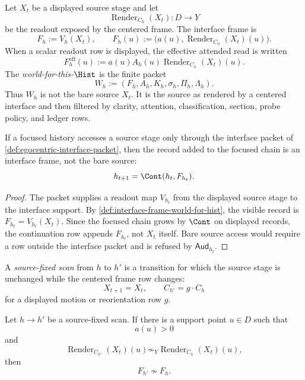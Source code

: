 \begin{definition}
\label{def:interface-frame-world-for-hist}
Let $X_t$ be a displayed source stage and let
$$
\operatorname{Render}_{C_h}(X_t):D\to Y
$$
be the readout exposed by the centered frame. The interface frame is
$$
F_h:=V_h(X_t),
\qquad
F_h(u):=
\bigl(a(u),\operatorname{Render}_{C_h}(X_t)(u)\bigr).
$$
When a scalar readout row is displayed, the effective attended read is
written
$$
F_h^{\mathrm{eff}}(u)
:=
a(u)A_h(u)\operatorname{Render}_{C_h}(X_t)(u).
$$
The \emph{world-for-this-$\Hist$} is the finite packet
$$
W_h:=(F_h,A_h,K_h,\sigma_h,\Pi_h,\Lambda_h).
$$
Thus $W_h$ is not the bare source $X_t$. It is the source as rendered by a
centered interface and then filtered by clarity, attention, classification,
section, probe policy, and ledger rows.
\end{definition}

\begin{theorem}
\label{thm:experience-enters-as-interface-frame}
If a focused history accesses a source stage only through the interface
packet of \autoref{def:egocentric-interface-packet}, then the record added
to the focused chain is an interface frame, not the bare source:
$$
h_{t+1}=\Cont(h_t,F_{h_t}).
$$
\end{theorem}

\begin{proof}
The packet supplies a readout map $V_{h_t}$ from the displayed source
stage to the interface support. By \autoref{def:interface-frame-world-for-hist},
the visible record is $F_{h_t}=V_{h_t}(X_t)$. Since the focused chain grows
by $\Cont$ on displayed records, the continuation row appends $F_{h_t}$,
not $X_t$ itself. Bare source access would require a row outside the
interface packet and is refused by $\mathsf{Aud}_{h_t}$.
\end{proof}

\begin{definition}
\label{def:source-fixed-scan}
A \emph{source-fixed scan} from $h$ to $h'$ is a transition for which the
source stage is unchanged while the centered frame row changes:
$$
X_{t+1}=X_t,
\qquad
C_{h'}=g\cdot C_h
$$
for a displayed motion or reorientation row $g$.
\end{definition}

\begin{theorem}
\label{thm:source-fixed-scan-can-change-frame}
Let $h\to h'$ be a source-fixed scan. If there is a support point $u\in D$
such that
$$
a(u)>0
$$
and
$$
\operatorname{Render}_{C_{h'}}(X_t)(u)
\not\sim_Y
\operatorname{Render}_{C_h}(X_t)(u),
$$
then
$$
F_{h'}\not\sim F_h.
$$
\end{theorem}

